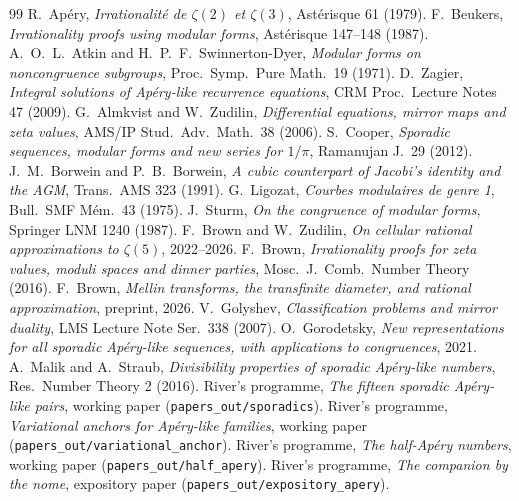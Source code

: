 \documentclass[11pt,reqno]{amsart}
\theoremstyle{plain}
\theoremstyle{definition}
\theoremstyle{remark}
\begin{document}
\begin{thebibliography}{99}
 R.~Ap\'ery, \emph{Irrationalit\'e de $\zeta(2)$ et
$\zeta(3)$}, Ast\'erisque 61 (1979).
 F.~Beukers, \emph{Irrationality proofs using modular
forms}, Ast\'erisque 147--148 (1987).
 A.~O.~L.~Atkin and H.~P.~F.~Swinnerton-Dyer, \emph{Modular
forms on noncongruence subgroups}, Proc.\ Symp.\ Pure Math.\ 19 (1971).
 D.~Zagier, \emph{Integral solutions of Ap\'ery-like
recurrence equations}, CRM Proc.\ Lecture Notes 47 (2009).
 G.~Almkvist and W.~Zudilin, \emph{Differential equations,
mirror maps and zeta values}, AMS/IP Stud.\ Adv.\ Math.\ 38 (2006).
 S.~Cooper, \emph{Sporadic sequences, modular forms and new
series for $1/\pi$}, Ramanujan J.\ 29 (2012).
 J.~M.~Borwein and P.~B.~Borwein, \emph{A cubic counterpart
of Jacobi's identity and the AGM}, Trans.\ AMS 323 (1991).
 G.~Ligozat, \emph{Courbes modulaires de genre 1},
Bull.\ SMF M\'em.\ 43 (1975).
 J.~Sturm, \emph{On the congruence of modular forms},
Springer LNM 1240 (1987).
 F.~Brown and W.~Zudilin, \emph{On cellular rational
approximations to $\zeta(5)$}, 2022--2026.
 F.~Brown, \emph{Irrationality proofs for zeta values,
moduli spaces and dinner parties}, Mosc.\ J.\ Comb.\ Number Theory (2016).
 F.~Brown, \emph{Mellin transforms, the transfinite
diameter, and rational approximation}, preprint, 2026.
 V.~Golyshev, \emph{Classification problems and mirror
duality}, LMS Lecture Note Ser.\ 338 (2007).
 O.~Gorodetsky, \emph{New representations for all sporadic
Ap\'ery-like sequences, with applications to congruences}, 2021.
 A.~Malik and A.~Straub, \emph{Divisibility properties of
sporadic Ap\'ery-like numbers}, Res.\ Number Theory 2 (2016).
 River's programme, \emph{The fifteen sporadic
Ap\'ery-like pairs}, working paper (\texttt{papers\_out/sporadics}).
 River's programme, \emph{Variational anchors for
Ap\'ery-like families}, working paper
(\texttt{papers\_out/variational\_anchor}).
 River's programme, \emph{The half-Ap\'ery numbers},
working paper (\texttt{papers\_out/half\_apery}).
 River's programme, \emph{The companion by the nome},
expository paper (\texttt{papers\_out/expository\_apery}).
\end{thebibliography}
\end{document}
